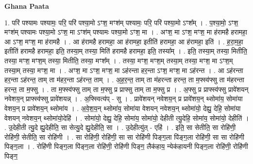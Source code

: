 \documentclass[17pt]{extarticle}
\begin{document}
\textbf{Ghana Paata } \newline

1. परि॑ पश्यामः पश्यामः॒ परि॒ परि॑ पश्या॒मो ऽꣳश॒ मꣳश॑म् पश्यामः॒ परि॒ परि॑ पश्या॒मो ऽꣳश᳚म् । . प॒श्या॒मो॒ ऽꣳश॒ मꣳश॑म् पश्यामः पश्या॒मो ऽꣳश॒ मा ऽꣳश॑म् पश्यामः पश्या॒मो ऽꣳश॒ मा । . अꣳश॒ मा ऽꣳश॒ मꣳश॒ मा ह॑रामहै हरामहा॒ आ ऽꣳश॒ मꣳश॒ मा ह॑रामहै । . आ ह॑रामहै हरामहा॒ आ ह॑रामहा॒ इतीति॑ हरामहा॒ आ ह॑रामहा॒ इति॑ । . ह॒रा॒म॒हा॒ इतीति॑ हरामहै हरामहा॒ इति॒ तस्या॒म् तस्या॒ मिति॑ हरामहै हरामहा॒ इति॒ तस्या᳚म् । . इति॒ तस्या॒म् तस्या॒ मितीति॒ तस्या॒ मꣳश॒ मꣳश॒म् तस्या॒ मितीति॒ तस्या॒ मꣳश᳚म् । . तस्या॒ मꣳश॒ मꣳश॒म् तस्या॒म् तस्या॒ मꣳश॒ मा ऽꣳश॒म् तस्या॒म् तस्या॒ मꣳश॒ मा । . अꣳश॒ मा ऽꣳश॒ मꣳश॒ मा ऽह॑रन्ता हर॒न्ता ऽꣳश॒ मꣳश॒ मा ऽह॑रन्त । . आ ऽह॑रन्ता हर॒न्ता ऽह॑रन्त॒ ताम् ता म॑हर॒न्ता ऽह॑रन्त॒ ताम् । . अ॒ह॒र॒न्त॒ ताम् ता म॑हरन्ता हरन्त॒ ता म॒फ्स्व॑फ्सु ता म॑हरन्ता हरन्त॒ ता म॒फ्सु । . ता म॒फ्स्व॑फ्सु ताम् ता म॒फ्सु प्र प्राफ्सु ताम् ता म॒फ्सु प्र । . अ॒फ्सु प्र प्राफ्स्व॑फ्सु प्रावे॑शयन् नवेशय॒न् प्राफ्स्व॑फ्सु प्रावे॑शयन्न् । . अ॒फ्स्वित्य॑प् - सु । . प्रावे॑शयन् नवेशय॒न् प्र प्रावे॑शय॒न् थ्सोमा॑य॒ सोमा॑या वेशय॒न् प्र प्रावे॑शय॒न् थ्सोमा॑य । . अ॒वे॒श॒य॒न् थ्सोमा॑य॒ सोमा॑या वेशयन् नवेशय॒न् थ्सोमा॑यो॒ देह्यु॒ देहि॒ सोमा॑या वेशयन् नवेशय॒न् थ्सोमा॑यो॒देहि॑ । . सोमा॑यो॒ देह्यु॒ देहि॒ सोमा॑य॒ सोमा॑यो॒ देहीती त्यु॒देहि॒ सोमा॑य॒ सोमा॑यो॒ देहीति॑ । . उ॒देहीती त्यु॒दे ह्यु॒देहीति॒ सा सेत्यु॒दे ह्यु॒देहीति॒ सा । . उ॒देहीत्यु॑त् - एहि॑ । . इति॒ सा सेतीति॒ सा रोहि॑णी॒ रोहि॑णी॒ सेतीति॒ सा रोहि॑णी । . सा रोहि॑णी॒ रोहि॑णी॒ सा सा रोहि॑णी पिङ्ग॒ला पि॑ङ्ग॒ला रोहि॑णी॒ सा सा रोहि॑णी पिङ्ग॒ला । . रोहि॑णी पिङ्ग॒ला पि॑ङ्ग॒ला रोहि॑णी॒ रोहि॑णी पिङ्ग॒ लैक॑हाय॒ न्येक॑हायनी पिङ्ग॒ला रोहि॑णी॒ रोहि॑णी पिङ्ग॒
\end{document}
